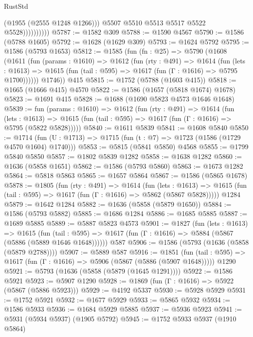 \begin{lexlean}{RustStd}
\begin{coremodule}
                          (@1955 (@2555 @1248 @1266)))
                        @5507
                        @5510
                        @5513
                        @5517
                        @5522
                        @5528))))))))))
@5787 := @1582 @309
@5788 := @1590 @4567
@5790 := @1586 (@5788 @1605)
@5792 := @1628 (@1629 @309)
@5793 := @1624 @5792
@5795 := @1586 (@5793 @1653)
@5812 := @1585
    (fun (fn : @25) =>
    @5790
      (@1608
        (@1611
          (fun (params : @1610) =>
          @1612
            (fun (rty : @491) =>
            @1614
              (fun (lets : @1613) =>
              @1615 (fun (tail : @595) => @1617 (fun (Γ : @1616) => @5795 @1700))))))
        @1746))
    @415
@5815 := @1752 (@5788 (@1603 @415))
@5818 := @1665 (@1666 @415) @4570
@5822 := @1586 (@1657 (@5818 @1674) @1678)
@5823 := @1691 @415
@5828 := @1688 (@1690 @5823 @4573 @1646 @1648)
@5839 := fun (params : @1610) =>
  @1612
    (fun (rty : @491) =>
    @1614
      (fun (lets : @1613) =>
      @1615 (fun (tail : @595) => @1617 (fun (Γ : @1616) => @5795 (@5822 @5828)))))
@5840 := @1611 @5839
@5841 := @1608 @5840
@5850 := @1714 (fun (U : @1713) => @1715 (fun (t : @7) => @1723 (@1586 (@1729 @4570 @1604) @1740)))
@5853 := @5815 (@5841 @5850) @4568
@5855 := @1799 @5840 @5850
@5857 := @1802 @5839 @1282
@5858 := @1638 @1282
@5860 := @1636 (@5858 @1651)
@5862 := @1586 (@5793 @5860)
@5863 := @1673 @1282
@5864 := @5818 @5863
@5865 := @1657 @5864
@5867 := @1586 (@5865 @1678)
@5878 := @1805
    (fun (rty : @491) =>
    @1614
      (fun (lets : @1613) =>
      @1615 (fun (tail : @595) => @1617 (fun (Γ : @1616) => @5862 (@5867 @5828)))))
    @1284
@5879 := @1642 @1284
@5882 := @1636 (@5858 (@5879 @1650))
@5884 := @1586 (@5793 @5882)
@5885 := @1686 @1284
@5886 := @1685 @5885
@5887 := @1689 @5885
@5889 := @5887 @5823 @4573
@5901 := @1827
    (fun (lets : @1613) =>
    @1615
      (fun (tail : @595) => @1617 (fun (Γ : @1616) => @5884 (@5867 (@5886 (@5889 @1646 @1648))))))
    @587
@5906 := @1586 (@5793 (@1636 (@5858 (@5879 @2788))))
@5907 := @5889 @587
@5916 := @1851
    (fun (tail : @595) => @1617 (fun (Γ : @1616) => @5906 (@5867 (@5886 (@5907 @1648)))))
    @1290
@5921 := @5793 (@1636 (@5858 (@5879 (@1645 @1291))))
@5922 := @1586 @5921
@5923 := @5907 @1290
@5928 := @1869 (fun (Γ : @1616) => @5922 (@5867 (@5886 @5923)))
@5929 := @4192 @5337
@5930 := @5928 @5929
@5931 := @1752 @5921
@5932 := @1677 @5929
@5933 := @5865 @5932
@5934 := @1586 @5933
@5936 := @1684 @5929 @5885
@5937 := @5936 @5923
@5941 := @5931 (@5934 @5937) (@1905 @5792)
@5945 := @1752 @5933 @5937 (@1910 @5864)

\end{coremodule}
\end{lexlean}
